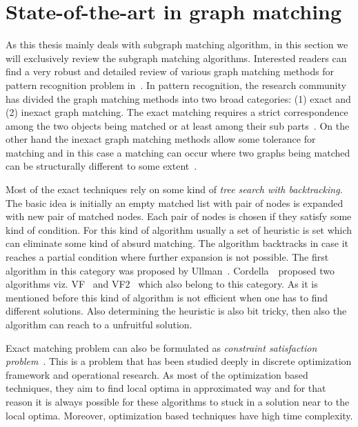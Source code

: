 \section{State-of-the-art in graph matching}
As this thesis mainly deals with subgraph matching algorithm, in this section we will exclusively review the subgraph matching algorithms. Interested readers can find a very robust and detailed review of various graph matching methods for pattern recognition problem in~\cite{Conte2004}. In pattern recognition, the research community has divided the graph matching methods into two broad categories: (1) exact and (2) inexact graph matching. The exact matching requires a strict correspondence among the two objects being matched or at least among their sub parts~\cite{Ullman1976,Cordella2004}. On the other hand the inexact graph matching methods allow some tolerance for matching and in this case a matching can occur where two graphs being matched can be structurally different to some extent~\cite{Pelillo1995,LladosPAMI2001}.

Most of the exact techniques rely on some kind of \emph{tree search with backtracking}. The basic idea is initially an empty matched list with pair of nodes is expanded with new pair of matched nodes. Each pair of nodes is chosen if they satisfy some kind of condition. For this kind of algorithm usually a set of heuristic is set which can eliminate some kind of absurd matching. The algorithm backtracks in case it reaches a partial condition where further expansion is not possible. The first algorithm in this category was proposed by Ullman~\cite{Ullman1976}. Cordella~\etal~proposed two algorithms viz. VF~\cite{Cordella1999} and VF2~\cite{Cordella2004} which also belong to this category. As it is mentioned before this kind of algorithm is not efficient when one has to find different solutions. Also determining the heuristic is also bit tricky, then also the algorithm can reach to a unfruitful solution.

Exact matching problem can also be formulated as \emph{constraint satisfaction problem}~\cite{Larrosa2002,Solnon2010}. This is a problem that has been studied deeply in discrete optimization framework and operational research. As most of the optimization based techniques, they aim to find local optima in approximated way and for that reason it is always possible for these algorithms to stuck in a solution near to the local optima. Moreover, optimization based techniques have high time complexity.

